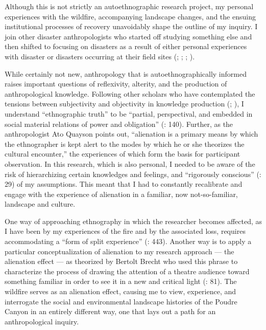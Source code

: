 \documentclass[
]{article}
\begin{document}
Although this is not strictly an autoethnographic research project, my personal experiences with the wildfire, accompanying landscape changes, and the ensuing institutional processes of recovery unavoidably shape the outline of my inquiry. I join other disaster anthropologists who started off studying something else and then shifted to focusing on disasters as a result of either personal experiences with disaster or disasters occurring at their field sites (; ; ; ).

While certainly not new, anthropology that is autoethnographically informed raises important questions of reflexivity, alterity, and the production of anthropological knowledge. Following other scholars who have contemplated the tensions between subjectivity and objectivity in knowledge production (; ), I understand ``ethnographic truth'' to be ``partial, perspectival, and embedded in social material relations of power and obligation'' (: 140). Further, as the anthropologist Ato Quayson points out, ``alienation is a primary means by which the ethnographer is kept alert to the modes by which he or she theorizes the cultural encounter,'' the experiences of which form the basis for participant observation. In this research, which is also personal, I needed to be aware of the risk of hierarchizing certain knowledges and feelings, and ``rigorously conscious'' (: 29) of my assumptions. This meant that I had to constantly recalibrate and engage with the experience of alienation in a familiar, now not-so-familiar, landscape and culture.

One way of approaching ethnography in which the researcher becomes affected, as I have been by my experiences of the fire and by the associated loss, requires accommodating a ``form of split experience'' (: 443). Another way is to apply a particular conceptualization of alienation to my research approach --- the alienation effect --- as theorized by Bertolt Brecht who used this phrase to characterize the process of drawing the attention of a theatre audience toward something familiar in order to see it in a new and critical light (: 81). The wildfire serves as an alienation effect, causing me to view, experience, and interrogate the social and environmental landscape histories of the Poudre Canyon in an entirely different way, one that lays out a path for an anthropological inquiry.
\end{document}
